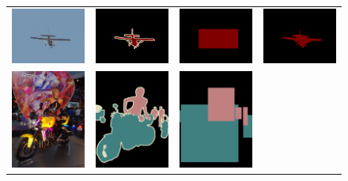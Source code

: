\begin{figure}
  \centering
  \begin{tabular}{c c c c}
    \includegraphics[width=0.21\linewidth]{fig/erode_bbox/img/2010_004063.jpg} & 
    \includegraphics[width=0.21\linewidth]{fig/erode_bbox/gt/2010_004063.png} & 
    \includegraphics[width=0.21\linewidth]{fig/erode_bbox/bbox/2010_004063.png} & 
    \includegraphics[width=0.21\linewidth]{fig/erode_bbox/crf/2010_004063.png} \\    
    \includegraphics[width=0.21\linewidth]{fig/erode_bbox/img/2009_002382.jpg} & 
    \includegraphics[width=0.21\linewidth]{fig/erode_bbox/gt/2009_002382.png} & 
    \includegraphics[width=0.21\linewidth]{fig/erode_bbox/bbox/2009_002382.png} & 

\end{tabular}
\end{figure}

